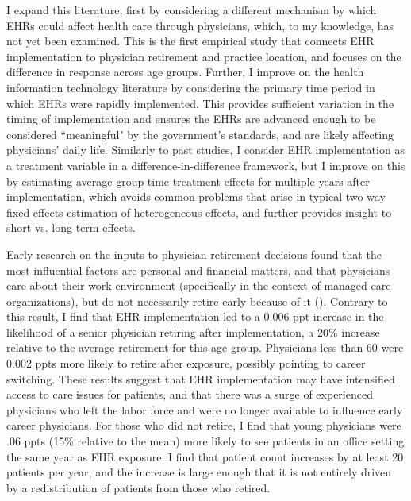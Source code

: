 \documentclass[12pt]{article}
\begin{document}
I expand this literature, first by considering a different mechanism by which EHRs could affect health care through physicians, which, to my knowledge, has not yet been examined. This is the first empirical study that connects EHR implementation to physician retirement and practice location, and focuses on the difference in response across age groups. Further, I improve on the health information technology literature by considering the primary time period in which EHRs were rapidly implemented. This provides sufficient variation in the timing of implementation and ensures the EHRs are advanced enough to be considered ``meaningful" by the government's standards, and are likely affecting physicians' daily life. Similarly to past studies, I consider EHR implementation as a treatment variable in a difference-in-difference framework, but I improve on this by estimating average group time treatment effects for multiple years after implementation, which avoids common problems that arise in typical two way fixed effects estimation of heterogeneous effects, and further provides insight to short vs. long term effects.  

Early research on the inputs to physician retirement decisions found that the most influential factors are personal and financial matters, and that physicians care about their work environment (specifically in the context of managed care organizations), but do not necessarily retire early because of it (\cite{Bahrami2002}). Contrary to this result, I find that EHR implementation led to a 0.006 ppt increase in the likelihood of a senior physician retiring after implementation, a 20\% increase relative to the average retirement for this age group. Physicians less than 60 were 0.002 ppts more likely to retire after exposure, possibly pointing to career switching. These results suggest that EHR implementation may have intensified access to care issues for patients, and that there was a surge of experienced physicians who left the labor force and were no longer available to influence early career physicians. For those who did not retire, I find that young physicians were .06 ppts (15\% relative to the mean) more likely to see patients in an office setting the same year as EHR exposure. I find that patient count increases by at least 20 patients per year, and the increase is large enough that it is not entirely driven by a redistribution of patients from those who retired. 
\end{document}
